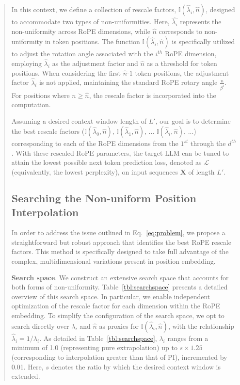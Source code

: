 \begin{abstract}
In this context, we define a collection of rescale factors, $\mathbb{I}(\hat{\lambda}_{i},\hat{n})$, designed to accommodate two types of non-uniformities. Here, $\hat{\lambda_i}$ represents the non-uniformity across RoPE dimensions, while $\hat{n}$ corresponds to non-uniformity in token positions. The function $\mathbb{I}(\hat{\lambda}_{i},\hat{n})$ is specifically utilized to adjust the rotation angle associated with the $i^{th}$ RoPE dimension, employing $\hat\lambda_{i}$ as the adjustment factor and $\hat{n}$ as a threshold for token positions. When considering the first $\hat{n}$-$1$ token positions, the adjustment factor $\hat\lambda_{i}$ is not applied, maintaining the standard RoPE rotary angle $\frac{n}{\beta^i}$. For positions where $n\ge\hat{n}$, the rescale factor is incorporated into the computation.

Assuming a desired context window length of $L'$, our goal is to determine the best rescale factors ($\mathbb{I}(\hat{\lambda}_{0},\hat{n})$, $\mathbb{I}(\hat{\lambda}_{1},\hat{n})$, ... $\mathbb{I}(\hat{\lambda}_{i},\hat{n})$, ...) corresponding to each of the RoPE dimensions from the $1^{st}$ through the $d^{th}$. With these rescaled $\text{RoPE}$ parameters, the target $\text{LLM}$ can be tuned to attain the lowest possible next token prediction loss, denoted as $\mathcal{L}$ (equivalently, the lowest perplexity), on input sequences $\mathbf{X}$ of length $L'$.

\subsection{Searching the Non-uniform Position Interpolation}

In order to address the issue outlined in Eq.~\ref{eq:problem}, we propose a straightforward but robust approach that identifies the best RoPE rescale factors. This method is specifically designed to take full advantage of the complex, multidimensional variations present in position embedding.

\textbf{Search space}. We construct an extensive search space that accounts for both forms of non-uniformity. Table~\ref{tbl:searchspace} presents a detailed overview of this search space. In particular, we enable independent optimization of the rescale factor for each dimension within the RoPE embedding. To simplify the configuration of the search space, we opt to search directly over $\lambda_i$ and $\hat{n}$ as proxies for $\mathbb{I}(\hat{\lambda}_{i},\hat{n})$, with the relationship $\hat{\lambda}_{i}=1/\lambda_i$. As detailed in Table~\ref{tbl:searchspace}, $\lambda_i$ ranges from a minimum of 1.0 (representing pure extrapolation) up to $s\times1.25$ (corresponding to interpolation greater than that of PI), incremented by 0.01. Here, $s$ denotes the ratio by which the desired context window is extended.


\end{abstract}
